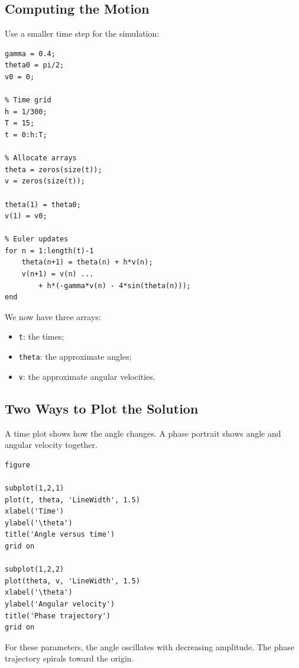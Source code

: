 \documentclass[10pt,letterpaper]{article}
\begin{document}
\subsection{Computing the Motion}

Use a smaller time step for the simulation:

\begin{lstlisting}[style=lecturematlab]
% Parameters and initial conditions
gamma = 0.4;
theta0 = pi/2;
v0 = 0;

% Time grid
h = 1/300;
T = 15;
t = 0:h:T;

% Allocate arrays
theta = zeros(size(t));
v = zeros(size(t));

theta(1) = theta0;
v(1) = v0;

% Euler updates
for n = 1:length(t)-1
    theta(n+1) = theta(n) + h*v(n);
    v(n+1) = v(n) ...
        + h*(-gamma*v(n) - 4*sin(theta(n)));
end
\end{lstlisting}

We now have three arrays:
\begin{itemize}
    \item \texttt{t}: the times;
    \item \texttt{theta}: the approximate angles;
    \item \texttt{v}: the approximate angular velocities.
\end{itemize}

\subsection{Two Ways to Plot the Solution}

A time plot shows how the angle changes.
A phase portrait shows angle and angular velocity
together.

\begin{lstlisting}[style=lecturematlab]
figure

subplot(1,2,1)
plot(t, theta, 'LineWidth', 1.5)
xlabel('Time')
ylabel('\theta')
title('Angle versus time')
grid on

subplot(1,2,2)
plot(theta, v, 'LineWidth', 1.5)
xlabel('\theta')
ylabel('Angular velocity')
title('Phase trajectory')
grid on
\end{lstlisting}

For these parameters, the angle oscillates with
decreasing amplitude. The phase trajectory spirals
toward the origin.
\end{document}

